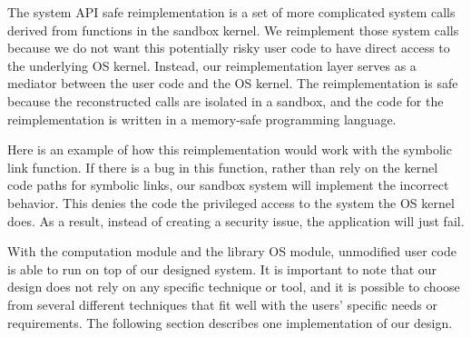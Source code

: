 {%

The system API safe reimplementation is a set of more complicated system calls
derived from functions in the sandbox kernel.
We reimplement those system calls because we do not want this potentially risky user code
to have direct access to the underlying OS kernel.
Instead, our reimplementation layer serves as a mediator between the user code
and the OS kernel. The reimplementation is safe
because the reconstructed calls are isolated in a sandbox, and the code for the
reimplementation is written in a memory-safe programming language.

Here is an example of how this reimplementation would work with the symbolic link function.
If there is a bug in this function, rather than rely on the kernel code paths
for symbolic links, our sandbox system will implement the incorrect behavior.
This denies the code the privileged access to the system the OS kernel does.
As a result, instead of creating a security issue, the application will just fail.

With the computation module and the library OS module, unmodified user code is able to run on top of our designed system.
It is important to note that our design does not rely on any specific technique or tool, and it is possible
to choose from several different techniques that fit well with the users' specific needs or requirements.
The following section describes one implementation of our design.

}

